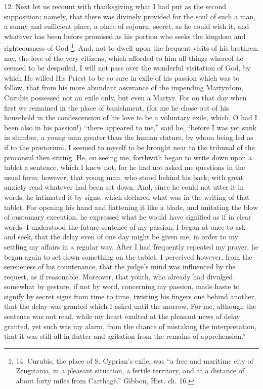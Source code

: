 12. Next let us recount with
thanksgiving what I had put as the second supposition; namely, that
there was divinely provided for the soul of such a man, a sunny and
sufficient place, a place of sojourn, secret, as he could wish it, and
whatever has been before promised as his portion who seeks the kingdom
and righteousness of God \footnote{14.
Curubis, the place of S. Cyprian's exile, was ``a free and maritime
city of Zeugitania, in a pleasant situation, a fertile territory, and
at a distance of about forty miles from Carthage.'' Gibbon, Hist. ch.
16.}.
And, not to dwell upon the frequent visits of his brethren, nay, the
love of the very citizens, which afforded to him all things
whereof he seemed to be despoiled, I will not pass over the wonderful
visitation of God, by which He willed His Priest to be so sure in
exile of his passion which was to follow, that from his more abundant
assurance of the impending Martyrdom, Curubis possessed not an exile
only, but even a Martyr. For on that day when first we remained in the
place of banishment, (for me he chose out of his household in the
condescension of his love to be a voluntary exile, which, O had I been
also in his passion!) ``there appeared to me,'' said he, ``before I was
yet sunk in slumber, a young man greater than the human stature, by
whom being led as if to the prætorium, I seemed to myself to be
brought near to the tribunal of the proconsul then sitting. He, on
seeing me, forthwith began to write down upon a tablet a sentence,
which I knew not, for he had not asked me questions in the usual form;
however, that young man, who stood behind his back, with great anxiety
read whatever had been set down. And, since he could not utter it in
words, he intimated it by signs, which declared what was in the
writing of that tablet. For opening his hand and flattening it like a
blade, and imitating the blow of customary execution, he expressed
what he would have signified as if in clear words. I understood the
future sentence of my passion. I began at once to ask and seek, that
the delay even of one day might be given me, in order to my settling
my affairs in a regular way. After I had frequently repeated my
prayer, he began again to set down something on the tablet. I
perceived however, from the sereneness of his countenance, that the
judge's mind was influenced by the request, as if reasonable.
Moreover, that youth, who already had divulged somewhat by gesture, if
not by word, concerning my passion, made haste to signify by secret
signs from time to time, twisting his fingers one behind another, that
the delay was granted which I asked until the morrow. For me, although
the sentence was not read, while my heart exulted at the pleasant news
of delay granted, yet such was my alarm, from the chance of mistaking
the interpretation, that it was still all in flutter and agitation
from the remains of apprehension.''

